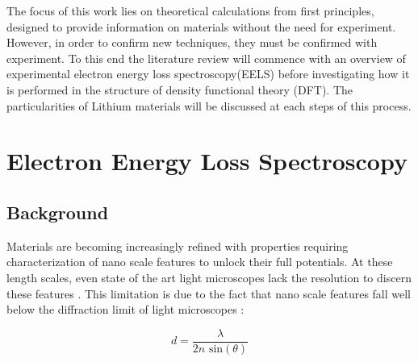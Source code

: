



The focus of this work lies on theoretical calculations from first principles, designed to provide information on materials without the need for experiment.  However, in order to confirm new techniques, they must be confirmed with experiment.  To this end the literature review will commence with an overview of experimental electron energy loss spectroscopy(EELS) before investigating how it is performed in the  structure of density functional theory (DFT).  The particularities of Lithium materials will be discussed at each steps of this process.  

\section{Electron Energy Loss Spectroscopy}

\subsection{Background}
Materials are becoming increasingly refined with properties requiring characterization of nano scale features to unlock their full potentials.  At these length scales, even state of the art light microscopes lack the resolution to discern these features \cite{rust_sub-diffraction-limit_2006}.  This limitation is due to the fact that nano scale features fall well below the diffraction limit of light microscopes \cite{hecht}: 

\begin{equation}
d = \frac{\lambda}{2n\textrm{ sin}(\theta)}
\end{equation}

